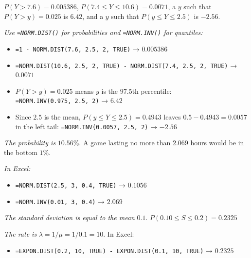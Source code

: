 \documentclass[
  11pt,
  letterpaper,
  DIV=11,
  numbers=noendperiod,
  oneside,
  open=any]{scrreprt}
\providecommand{\tightlist}{%
  \setlength{\itemsep}{0pt}\setlength{\parskip}{0pt}}\usepackage{longtable,booktabs,array}
\newenvironment{bsanswerkey}[2]{%
  \begin{tcolorbox}[bsbase, colback=bspaper2, colframe=bsline, fontupper=\small,
    title={\hypertarget{a-#1}{}\label{a-#1}\hyperlink{q-#1}{\textcolor{bsink2}{\MakeUppercase{#2}}}\hfill
      \hyperlink{q-#1}{\textcolor{bsaccent}{\normalfont\footnotesize back to page \pageref{q-#1}}}}]}%
  {\end{tcolorbox}}
\begin{document}
\begin{bsanswerkey}{bsans100}{Exercise 2, question 2}

\(P(Y>7.6)=0.005386\), \(P(7.4 \leq Y \leq 10.6)=0.0071\), a \(y\) such
that \(P(Y>y)=0.025\) is \(6.42\), and a \(y\) such that
\(P(y \leq Y \leq 2.5)\) is \(-2.56\).

\emph{Use \texttt{=NORM.DIST()} for probabilities and
\texttt{=NORM.INV()} for quantiles:}

\begin{itemize}
\tightlist
\item
  \texttt{=1\ -\ NORM.DIST(7.6,\ 2.5,\ 2,\ TRUE)} → \(0.005386\)
\item
  \texttt{=NORM.DIST(10.6,\ 2.5,\ 2,\ TRUE)\ -\ NORM.DIST(7.4,\ 2.5,\ 2,\ TRUE)}
  → \(0.0071\)
\item
  \(P(Y>y)=0.025\) means \(y\) is the \(97.5\)th percentile:
  \texttt{=NORM.INV(0.975,\ 2.5,\ 2)} → \(6.42\)
\item
  Since \(2.5\) is the mean, \(P(y \leq Y \leq 2.5)=0.4943\) leaves
  \(0.5-0.4943=0.0057\) in the left tail:
  \texttt{=NORM.INV(0.0057,\ 2.5,\ 2)} → \(-2.56\)
\end{itemize}

\end{bsanswerkey}

\begin{bsanswerkey}{bsans101}{Exercise 2, question 3}

\emph{The probability is} \(10.56\)\%. A game lasting no more than
\(2.069\) hours would be in the bottom \(1\)\%.

\emph{In Excel:}

\begin{itemize}
\tightlist
\item
  \texttt{=NORM.DIST(2.5,\ 3,\ 0.4,\ TRUE)} → \(0.1056\)
\item
  \texttt{=NORM.INV(0.01,\ 3,\ 0.4)} → \(2.069\)
\end{itemize}

\end{bsanswerkey}

\begin{bsanswerkey}{bsans102}{Exercise 3, question 1}

\emph{The standard deviation is equal to the mean} \(0.1\).
\(P(0.10 \leq S \leq 0.2)=0.2325\)

\emph{The rate is} \(\lambda = 1/\mu = 1/0.1 = 10\). In Excel:

\begin{itemize}
\tightlist
\item
  \texttt{=EXPON.DIST(0.2,\ 10,\ TRUE)\ -\ EXPON.DIST(0.1,\ 10,\ TRUE)}
  → \(0.2325\)
\end{itemize}

\end{bsanswerkey}
\end{document}
